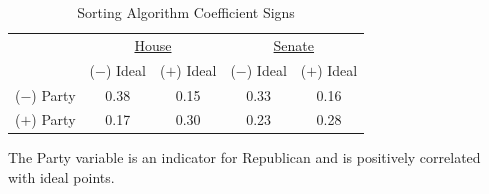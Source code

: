 \documentclass[12pt]{article}
\newcommand\fnote[1]{\captionsetup{font=normalsize}\caption*{#1}}
\begin{document}
\begin{table}[H]
\centering
\begin{threeparttable}
\label{tab-sorting}
\singlespacing
\caption{Sorting Algorithm Coefficient Signs}
\begin{tabular}{l cc cc}
\hline
&\multicolumn{2}{c}{\underline{House}}&\multicolumn{2}{c}{\underline{Senate}}\\
& ($-$) Ideal & ($+$) Ideal & ($-$) Ideal & ($+$) Ideal \\
\hline
($-$) Party & 0.38 & 0.15& 0.33 & 0.16  \\
($+$) Party & 0.17 & 0.30& 0.23 & 0.28 \\
\hline
\end{tabular}
\begin{tablenotes}
   \item
   The Party variable is an indicator for Republican and is positively correlated with ideal points.
 \end{tablenotes}
\end{threeparttable}
\end{table}

\end{document}
